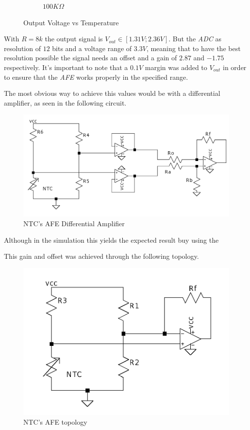 \documentclass[12pt]{article}
\begin{document}
\begin{figure}[h]
\begin{subfigure}{0.45\textwidth}
            \caption{$100K\Omega$}
        \end{subfigure}
        \caption{Output Voltage vs Temperature}
    \end{figure}

    With $R=8k$ the output signal is $V_{out} \in [1.31V;2.36V]$. 
    But the \textit{ADC} as resolution of $12$ bits and a voltage range of $3.3V$, meaning that to have the best resolution possible the signal needs an offset and a gain of $2.87$ and $-1.75$ respectively. 
    It's important to note that a $0.1V$ margin was added to $V_{out}$ in order to ensure that the \textit{AFE} works properly in the specified range.
    
    The most obvious way to achieve this values would be with a differential amplifier, 
    as seen in the following circuit.

     \begin{figure}[H] 
        \centering
        \includegraphics*[scale = 0.25]{images/AFENTCDiffAmp.png}
        \caption{NTC's AFE Differential Amplifier}
        \label{wrap-fig:1}
    \end{figure}

    Although in the simulation this yields the expected result buy using the 
    
    This gain and offset was achieved through the following topology.
    
    \begin{figure}[H] 
        \centering
        \includegraphics*[scale = 0.25]{images/AFENTC.png}
        \caption{NTC's AFE topology}
        \label{wrap-fig:1}
    \end{figure}
\end{document}
